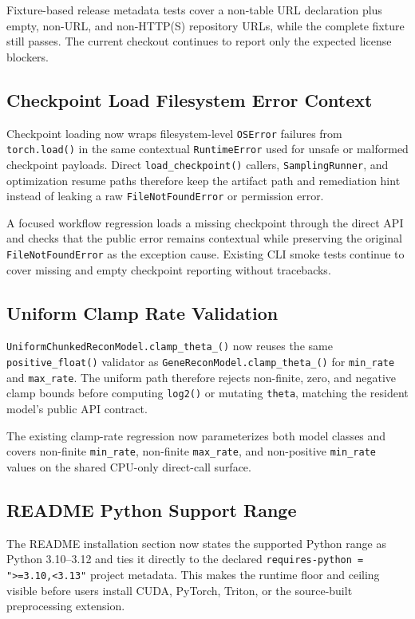 \documentclass[11pt]{article}
\begin{document}
Fixture-based release metadata tests cover a non-table URL declaration plus
empty, non-URL, and non-HTTP(S) repository URLs, while the complete fixture still
passes.  The current checkout continues to report only the expected license
blockers.

\subsection{Checkpoint Load Filesystem Error Context}

Checkpoint loading now wraps filesystem-level \texttt{OSError} failures from
\texttt{torch.load()} in the same contextual \texttt{RuntimeError} used for
unsafe or malformed checkpoint payloads.  Direct \texttt{load\_checkpoint()}
callers, \texttt{SamplingRunner}, and optimization resume paths therefore keep
the artifact path and remediation hint instead of leaking a raw
\texttt{FileNotFoundError} or permission error.

A focused workflow regression loads a missing checkpoint through the direct API
and checks that the public error remains contextual while preserving the original
\texttt{FileNotFoundError} as the exception cause.  Existing CLI smoke tests
continue to cover missing and empty checkpoint reporting without tracebacks.

\subsection{Uniform Clamp Rate Validation}

\texttt{UniformChunkedReconModel.clamp\_theta\_()} now reuses the same
\texttt{positive\_float()} validator as \texttt{GeneReconModel.clamp\_theta\_()}
for \texttt{min\_rate} and \texttt{max\_rate}.  The uniform path therefore
rejects non-finite, zero, and negative clamp bounds before computing
\texttt{log2()} or mutating \texttt{theta}, matching the resident model's public
API contract.

The existing clamp-rate regression now parameterizes both model classes and
covers non-finite \texttt{min\_rate}, non-finite \texttt{max\_rate}, and
non-positive \texttt{min\_rate} values on the shared CPU-only direct-call
surface.

\subsection{README Python Support Range}

The README installation section now states the supported Python range as Python
3.10--3.12 and ties it directly to the declared
\texttt{requires-python = ">=3.10,<3.13"} project metadata.  This makes the
runtime floor and ceiling visible before users install CUDA, PyTorch, Triton, or
the source-built preprocessing extension.
\end{document}
